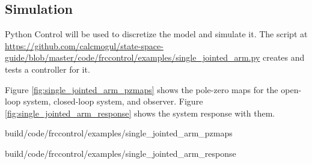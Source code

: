 \subsection{Simulation}

Python Control will be used to discretize the model and simulate it. The script
at
\url{https://github.com/calcmogul/state-space-guide/blob/master/code/frccontrol/examples/single_jointed_arm.py}
creates and tests a controller for it.

Figure \ref{fig:single_jointed_arm_pzmaps} shows the pole-zero maps for the
open-loop system, closed-loop system, and observer. Figure
\ref{fig:single_jointed_arm_response} shows the system response with them.

\begin{svg}{build/code/frccontrol/examples/single_jointed_arm_pzmaps}
  \caption{Drivetrain pole-zero maps.}
  \label{fig:drivetrain_pzmaps}
\end{svg}

\begin{svg}{build/code/frccontrol/examples/single_jointed_arm_response}
  \caption{Single-jointed arm response.}
  \label{fig:single_jointed_arm_response}
\end{svg}
